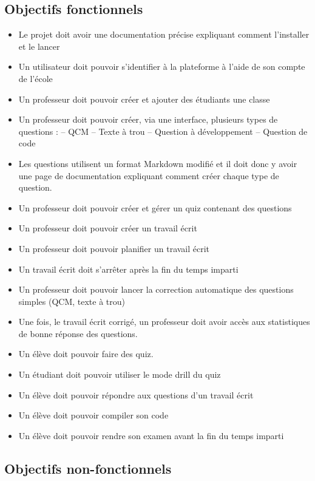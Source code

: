\subsection*{Objectifs fonctionnels}
\begin{itemize}
    \item Le projet doit avoir une documentation précise expliquant comment l'installer et le lancer
    \item Un utilisateur doit pouvoir s'identifier à la plateforme à l'aide de son compte de l'école
    \item Un professeur doit pouvoir créer et ajouter des étudiants une classe
    \item Un professeur doit pouvoir créer, via une interface, plusieurs types de questions :
          \subitem – QCM
          \subitem – Texte à trou
          \subitem – Question à développement
          \subitem – Question de code
    \item Les questions utilisent un format Markdown modifié et il doit donc y avoir une page de documentation expliquant comment créer chaque type de question.
    \item Un professeur doit pouvoir créer et gérer un quiz contenant des questions
    \item Un professeur doit pouvoir créer un travail écrit
    \item Un professeur doit pouvoir planifier un travail écrit
    \item Un travail écrit doit s'arrêter après la fin du temps imparti
    \item Un professeur doit pouvoir lancer la correction automatique des questions simples (QCM, texte à trou)
    \item Une fois, le travail écrit corrigé, un professeur doit avoir accès aux statistiques de bonne réponse des questions.
    \item Un élève doit pouvoir faire des quiz.
    \item Un étudiant doit pouvoir utiliser le mode drill du quiz
    \item Un élève doit pouvoir répondre aux questions d'un travail écrit
    \item Un élève doit pouvoir compiler son code
    \item Un élève doit pouvoir rendre son examen avant la fin du temps imparti
\end{itemize}

\subsection*{Objectifs non-fonctionnels}


